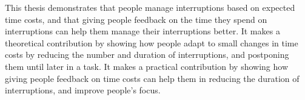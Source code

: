 
This thesis demonstrates that people manage interruptions based on expected time costs, and that giving people feedback on the time they spend on interruptions can help them manage their interruptions better. It makes a theoretical contribution by showing how people adapt to small changes in time costs by reducing the number and duration of interruptions, and postponing them until later in a task. It makes a practical contribution by showing how giving people feedback on time costs can help them in reducing the duration of interruptions, and improve people's focus. 